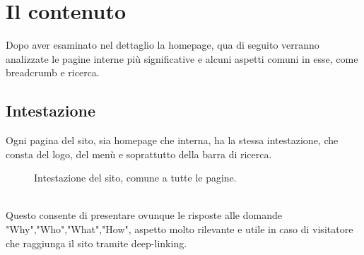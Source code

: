 \section{Il contenuto}
Dopo aver esaminato nel dettaglio la homepage, qua di seguito verranno analizzate le pagine interne più significative e alcuni aspetti comuni in esse, come breadcrumb e ricerca. 

\subsection{Intestazione}
Ogni pagina del sito, sia homepage che interna, ha la stessa intestazione, che consta del logo, del menù e soprattutto della barra di ricerca.
\begin{figure}[!htb]
	\caption{\label{fig:figura5}} Intestazione del sito, comune a tutte le pagine.
\end{figure} \\
Questo consente di presentare ovunque le risposte alle domande "Why","Who","What","How", aspetto molto rilevante e utile in caso di visitatore che raggiunga il sito tramite deep-linking.


